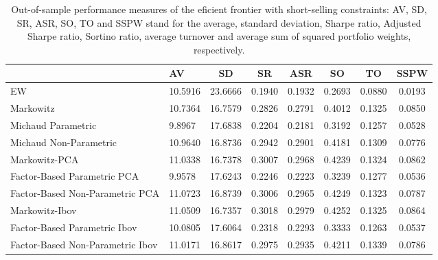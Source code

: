 \begin{table}

\caption{\label{tab:empirical_ef_2}Out-of-sample performance measures of the eficient frontier with short-selling constraints: AV, SD, SR, ASR, SO, TO and SSPW stand for the average, standard deviation, Sharpe ratio, Adjusted Sharpe ratio, Sortino ratio, average turnover and average sum of squared portfolio weights, respectively.}
\centering
\begin{tabular}[t]{l|l|c|c|c|c|c|c}
\hline
  & AV & SD & SR & ASR & SO & TO & SSPW\\
\hline
EW & 10.5916 & 23.6666 & 0.1940 & 0.1932 & 0.2693 & 0.0880 & 0.0193\\
\hline
Markowitz & 10.7364 & 16.7579 & 0.2826 & 0.2791 & 0.4012 & 0.1325 & 0.0850\\
\hline
Michaud Parametric & 9.8967 & 17.6838 & 0.2204 & 0.2181 & 0.3192 & 0.1257 & 0.0528\\
\hline
Michaud Non-Parametric & 10.9640 & 16.8736 & 0.2942 & 0.2901 & 0.4181 & 0.1309 & 0.0776\\
\hline
Markowitz-PCA & 11.0338 & 16.7378 & 0.3007 & 0.2968 & 0.4239 & 0.1324 & 0.0862\\
\hline
Factor-Based Parametric PCA & 9.9578 & 17.6243 & 0.2246 & 0.2223 & 0.3239 & 0.1277 & 0.0536\\
\hline
Factor-Based Non-Parametric PCA & 11.0723 & 16.8739 & 0.3006 & 0.2965 & 0.4249 & 0.1323 & 0.0787\\
\hline
Markowitz-Ibov & 11.0509 & 16.7357 & 0.3018 & 0.2979 & 0.4252 & 0.1325 & 0.0864\\
\hline
Factor-Based Parametric Ibov & 10.0805 & 17.6064 & 0.2318 & 0.2293 & 0.3333 & 0.1263 & 0.0537\\
\hline
Factor-Based Non-Parametric Ibov & 11.0171 & 16.8617 & 0.2975 & 0.2935 & 0.4211 & 0.1339 & 0.0786\\
\hline
\end{tabular}
\end{table}
